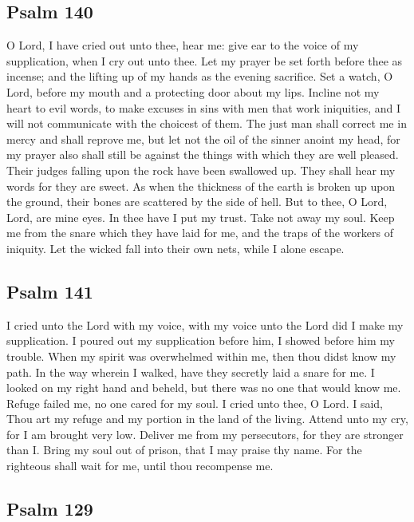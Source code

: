 \subsection{Psalm 140}
O Lord, I have cried out unto thee, hear me: give ear to the voice of my supplication, when I cry out unto thee. Let my prayer be set forth before thee as incense; and the lifting up of my hands as the evening sacrifice.  Set a watch, O Lord, before my mouth and a protecting door about my lips. Incline not my heart to evil words, to make excuses in sins with men that work iniquities, and I will not communicate with the choicest of them. The just man shall correct me in mercy and shall reprove me, but let not the oil of the sinner anoint my head, for my prayer also shall still be against the things with which they are well pleased. Their judges falling upon the rock have been swallowed up. They shall hear my words for they are sweet. As when the thickness of the earth is broken up upon the ground, their bones are scattered by the side of hell. But to thee, O Lord, Lord, are mine eyes. In thee have I put my trust. Take not away my soul. Keep me from the snare which they have laid for me, and the traps of the workers of iniquity. Let the wicked fall into their own nets, while I alone escape.

\subsection{Psalm 141}

I cried unto the Lord with my voice, with my voice unto the Lord did I make my supplication. I poured out my supplication before him, I showed before him my trouble. When my spirit was overwhelmed within me, then thou didst know my path. In the way wherein I walked, have they secretly laid a snare for me. I looked on my right hand and beheld, but there was no one that would know me. Refuge failed me, no one cared for my soul. I cried unto thee, O Lord. I said, Thou art my refuge and my portion in the land of the living. Attend unto my cry, for I am brought very low. Deliver me from my persecutors, for they are stronger than I. Bring my soul out of prison, that I may praise thy name. For the righteous shall wait for me, until thou recompense me.

\subsection{Psalm 129}

